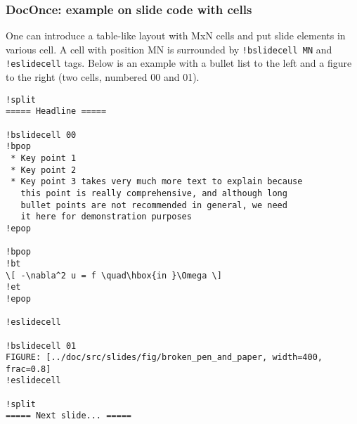 \documentclass{beamer}
\begin{document}
\begin{frame}
\frametitle{DocOnce: example on slide code with cells}

One can introduce a table-like layout with MxN cells and
put slide elements in various cell. A cell with position
MN is surrounded by \Verb?!bslidecell MN? and \Verb?!eslidecell?
tags. Below is an example with a bullet list to the left and
a figure to the right (two cells, numbered 00 and 01).
\begin{Verbatim}[numbers=none,fontsize=\fontsize{9pt}{9pt},baselinestretch=0.95]
!split
===== Headline =====

!bslidecell 00
!bpop
 * Key point 1
 * Key point 2
 * Key point 3 takes very much more text to explain because
   this point is really comprehensive, and although long
   bullet points are not recommended in general, we need
   it here for demonstration purposes
!epop

!bpop
!bt
\[ -\nabla^2 u = f \quad\hbox{in }\Omega \]
!et
!epop

!eslidecell

!bslidecell 01
FIGURE: [../doc/src/slides/fig/broken_pen_and_paper, width=400, frac=0.8]
!eslidecell

!split
===== Next slide... =====

\end{Verbatim}
\end{frame}
\end{document}
